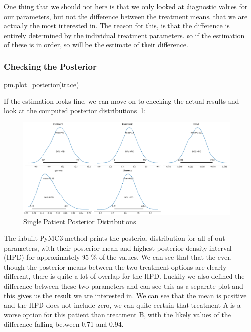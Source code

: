 \documentclass[12pt,a4paper,leqno]{report}
\theoremstyle{plain}
\theoremstyle{definition}
\theoremstyle{remark}
\begin{document}

One thing that we should not here is that we only looked at diagnostic values for our
parameters, but not the difference between the treatment means, that we are actually the
most interested in. The reason for this, is that the difference is entirely determined
by the individual treatment parameters, so if the estimation of these is in order, so
will be the estimate of their difference.

\subsubsection{Checking the Posterior}

\bigskip
\begin{pyverbatim}
pm.plot_posterior(trace)
\end{pyverbatim}
\bigskip

If the estimation looks fine, we can move on to checking the actual results and look at
the computed posterior distributions\ \ref{singlepatientposteriors}:

\bigskip
\begin{figure}[H]
    \caption{Single Patient Posterior Distributions}
    \label{singlepatientposteriors}
    \bigskip
    \includegraphics[width=\textwidth,height=\textheight,keepaspectratio]{single_patient_posteriors.pdf}
\end{figure}
\bigskip

The inbuilt PyMC3 method prints the posterior distribution for all of out parameters,
with their posterior mean and highest posterior density interval (HPD) for approximately
95 \% of the values. We can see that that the even though the posterior means between
the two treatment options are clearly different, there is quite a lot of overlap for the
HPD. Luckily we also defined the difference between these two parameters and can see
this as a separate plot and this gives us the result we are interested in. We can see
that the mean is positive and the HPD does not include zero, we can quite certain that
treatment A is a worse option for this patient than treatment B, with the likely values of
the difference falling between 0.71 and 0.94.
\end{document}
